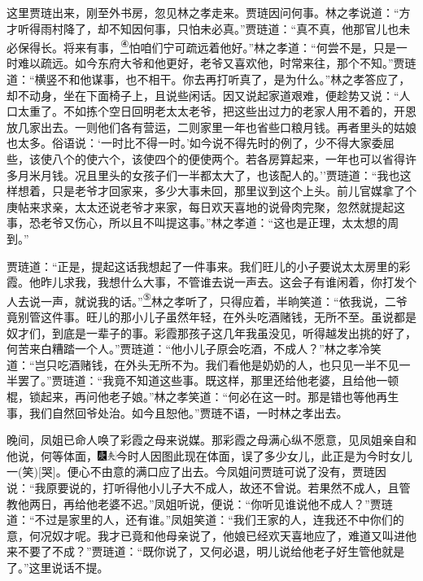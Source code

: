 这里贾琏出来，刚至外书房，忽见林之孝走来。贾琏因问何事。林之孝说道：``方才听得雨村降了，却不知因何事，只怕未必真。''贾琏道：``真不真，他那官儿也未必保得长。将来有事，\href{../Text/part0076_split_000.html\#lnkback_4_a}{\textsuperscript{④}}怕咱们宁可疏远着他好。''林之孝道：``何尝不是，只是一时难以疏远。如今东府大爷和他更好，老爷又喜欢他，时常来往，那个不知。''贾琏道：``横竖不和他谋事，也不相干。你去再打听真了，是为什么。''林之孝答应了，却不动身，坐在下面椅子上，且说些闲话。因又说起家道艰难，便趁势又说：``人口太重了。不如拣个空日回明老太太老爷，把这些出过力的老家人用不着的，开恩放几家出去。一则他们各有营运，二则家里一年也省些口粮月钱。再者里头的姑娘也太多。俗语说：`一时比不得一时。'如今说不得先时的例了，少不得大家委屈些，该使八个的使六个，该使四个的便使两个。若各房算起来，一年也可以省得许多月米月钱。况且里头的女孩子们一半都太大了，也该配人的。''贾琏道：``我也这样想着，只是老爷才回家来，多少大事未回，那里议到这个上头。前儿官媒拿了个庚帖来求亲，太太还说老爷才来家，每日欢天喜地的说骨肉完聚，忽然就提起这事，恐老爷又伤心，所以且不叫提这事。''林之孝道：``这也是正理，太太想的周到。''

贾琏道：``正是，提起这话我想起了一件事来。我们旺儿的小子要说太太房里的彩霞。他昨儿求我，我想什么大事，不管谁去说一声去。这会子有谁闲着，你打发个人去说一声，就说我的话。''\href{../Text/part0076_split_000.html\#lnkback_5_a}{\textsuperscript{⑤}}林之孝听了，只得应着，半晌笑道：``依我说，二爷竟别管这件事。旺儿的那小儿子虽然年轻，在外头吃酒赌钱，无所不至。虽说都是奴才们，到底是一辈子的事。彩霞那孩子这几年我虽没见，听得越发出挑的好了，何苦来白糟踏一个人。''贾琏道：``他小儿子原会吃酒，不成人？''林之孝冷笑道：``岂只吃酒赌钱，在外头无所不为。我们看他是奶奶的人，也只见一半不见一半罢了。''贾琏道：``我竟不知道这些事。既这样，那里还给他老婆，且给他一顿棍，锁起来，再问他老子娘。''林之孝笑道：``何必在这一时。那是错也等他再生事，我们自然回爷处治。如今且恕他。''贾琏不语，一时林之孝出去。

晚间，凤姐已命人唤了彩霞之母来说媒。那彩霞之母满心纵不愿意，见凤姐亲自和他说，何等体面，{\includegraphics[width=3mm]{../Images/00004}\includegraphics[width=3mm]{../Images/00012}\footnotesize \kaishu 今时人因图此现在体面，误了多少女儿，此正是为今时女儿一{(笑)}{[}哭{]}。}便心不由意的满口应了出去。今凤姐问贾琏可说了没有，贾琏因说：``我原要说的，打听得他小儿子大不成人，故还不曾说。若果然不成人，且管教他两日，再给他老婆不迟。''凤姐听说，便说：``你听见谁说他不成人？''贾琏道：``不过是家里的人，还有谁。''凤姐笑道：``我们王家的人，连我还不中你们的意，何况奴才呢。我才已竟和他母亲说了，他娘已经欢天喜地应了，难道又叫进他来不要了不成？''贾琏道：``既你说了，又何必退，明儿说给他老子好生管他就是了。''这里说话不提。

